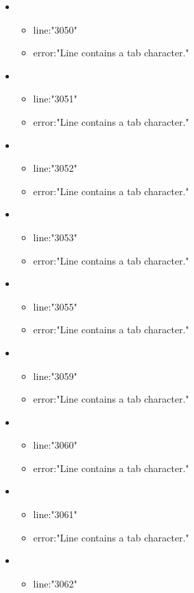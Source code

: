 \begin{itemize}
	\item 
	\begin{itemize} 
		\item line:"3050" 
		\item error:"Line contains a tab character." 
	\end{itemize}
	\item 
	\begin{itemize} 
		\item line:"3051" 
		\item error:"Line contains a tab character." 
	\end{itemize}
	\item 
	\begin{itemize} 
		\item line:"3052" 
		\item error:"Line contains a tab character." 
	\end{itemize}
	\item 
	\begin{itemize} 
		\item line:"3053" 
		\item error:"Line contains a tab character." 
	\end{itemize}
	\item 
	\begin{itemize} 
		\item line:"3055" 
		\item error:"Line contains a tab character." 
	\end{itemize}
	\item 
	\begin{itemize} 
		\item line:"3059" 
		\item error:"Line contains a tab character." 
	\end{itemize}
	\item 
	\begin{itemize} 
		\item line:"3060" 
		\item error:"Line contains a tab character." 
	\end{itemize}
	\item 
	\begin{itemize} 
		\item line:"3061" 
		\item error:"Line contains a tab character." 
	\end{itemize}
	\item 
	\begin{itemize} 
		\item line:"3062" 

\end{itemize}
\end{itemize}

